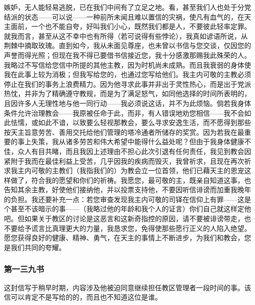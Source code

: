 嫉妒，无人能轻易逃脱，已在我们中间有了立足之地。看，甚至我们人也处于分党结派的状态——可以说——一种前所未闻且难以置信的灾祸，使凡有血气的，在天主面前，一个也不能自夸，好叫我们小心，既然我们都是人，不要彼此轻率定罪。就我而言，甚至从这不幸中也有所得（若可说得有些悖论），我真如谚语所说，从荆棘中摘取玫瑰。直到如今，我从未面见尊座，也未曾以书信与您交谈，仅因您的声誉而得光照；但现在我不得已要借书信接近您，我十分感激那赐我此殊荣的人。我略过不写信给您信中所提的其他主教，因为时机尚未成熟。而且我衰弱的身体使我在此事上较为消极；但我写给您的，也通过您写给他们。我主内可敬的主教必须停止在我们的事务上浪费精力。因为他寻求此事并非出于灵性热心，而是出于党派热忱，并非为了精确遵守教规，而是为了满足怒气，如同他选择的时间所表明的，且因许多人无理性地与他一同行动——我必须说这话，并不为此烦恼。倘若我身体条件允许治理教会——我原被任命于此，而非，有人错误地劝您相信——我不会如此怯懦，或如此不谙，以致要么轻视那教会，要么寻求安逸生活，而不愿得到那些按天主旨意劳苦、善用交托给他们管理的塔冷通者所储存的奖赏。因为若我在最重要的事上失策，我从诸多劳苦和伟大希望中能得什么益处呢？但由于我身体健康不佳，众人有目共睹，而且我因上述理由不担心此次引退有任何责任，我见到教会因紧附于我而在最佳利益上受苦，几乎因我的疾病而毁灭，我曾祈求，且现在再次祈求我主内可敬的主教们（我指我们的）为教会立一位首领，他们已藉天主的恩宠这样做了，符合我的愿望和你们的祈祷。我愿您，最可敬的主，既亲自知道这事，也告知其余主教，好使他们接纳他，并以投票支持他，不要因听信诽谤而加重我晚年的负担。我还要补充一点：若您审查发现我主内可敬的司铎在信仰上有罪——这是个甚至不该暗示的事——（我略过他的年龄和我个人的证言）你们自己就这样定他吧。但如果关于教区的讨论是这恶言和这新奇指控的原因，请不要被诽谤带走，也不要给予谎言比真理更大的力量，我恳求您，免得使那些愿行正义的人陷入绝望。愿您获得良好的健康、精神、勇气，在天主的事情上不断进步，为我们和教会，您是我们共同的夸耀。\par


\subsubsection{第一三九书}

这封信写于稍早时期，内容涉及他被迫同意继续担任教区管理者一段时间的事。该信可以肯定不是写给的的，而且也不知道这位是谁。\par

